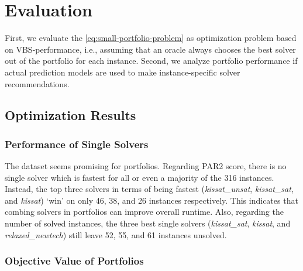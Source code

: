 \documentclass[conference]{IEEEtran}
\begin{document}
\section{Evaluation}
\label{sec:evaluation}

First, we evaluate the \ref{eq:small-portfolio-problem} as optimization problem based on VBS-performance, i.e., assuming that an oracle always chooses the best solver out of the portfolio for each instance.
Second, we analyze portfolio performance if actual prediction models are used to make instance-specific solver recommendations.

\subsection{Optimization Results}

\subsubsection{Performance of Single Solvers}

The dataset seems promising for portfolios.
Regarding PAR2 score, there is no single solver which is fastest for all or even a majority of the 316 instances.
Instead, the top three solvers in terms of being fastest (\emph{kissat\_unsat}, \emph{kissat\_sat}, and \emph{kissat}) `win' on only 46, 38, and 26 instances respectively.
This indicates that combing solvers in portfolios can improve overall runtime.
Also, regarding the number of solved instances, the three best single solvers (\emph{kissat\_sat}, \emph{kissat}, and \emph{relaxed\_newtech}) still leave 52, 55, and 61 instances unsolved.

\subsubsection{Objective Value of Portfolios}
\end{document}
